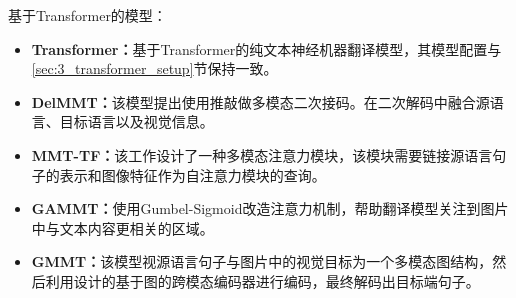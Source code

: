 基于Transformer的模型：
\begin{itemize}
    \item \textbf{Transformer：}基于Transformer的纯文本神经机器翻译模型，其模型配置与\ref{sec:3_transformer_setup}节保持一致。
    \item \textbf{DelMMT：}该模型提出使用推敲做多模态二次接码。在二次解码中融合源语言、目标语言以及视觉信息。
    \item \textbf{MMT-TF：}该工作设计了一种多模态注意力模块，该模块需要链接源语言句子的表示和图像特征作为自注意力模块的查询。
    \item \textbf{GAMMT：}使用Gumbel-Sigmoid改造注意力机制，帮助翻译模型关注到图片中与文本内容更相关的区域。
    \item \textbf{GMMT：}该模型视源语言句子与图片中的视觉目标为一个多模态图结构，然后利用设计的基于图的跨模态编码器进行编码，最终解码出目标端句子。
\end{itemize}
